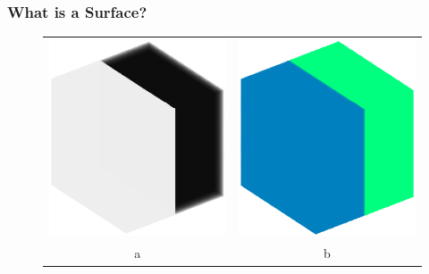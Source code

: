 \documentclass[9pt]{beamer}
\begin{document}
	\begin{frame}
			\frametitle{What is a Surface?}


				\begin{figure}
				\begin{tabular}{c c}
	
						\includegraphics[scale=0.2]{intensity3d} &

						\includegraphics[scale=0.2]{colourinterface3d}\\
						a & b\\
		

\end{tabular}
\end{figure}
\end{frame}
\end{document}
